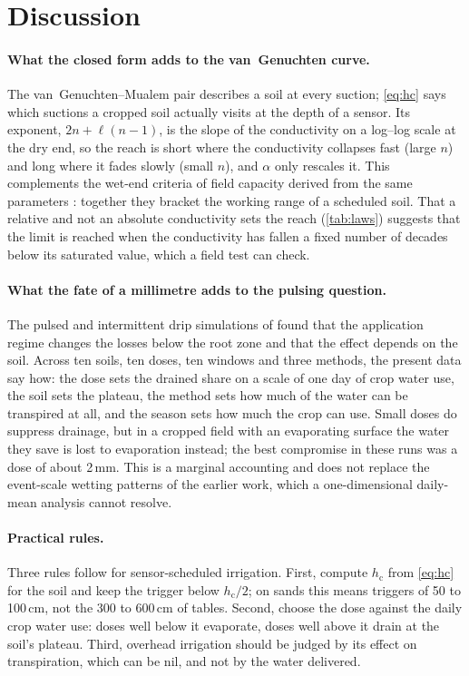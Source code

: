 \documentclass[preprint,12pt,authoryear]{elsarticle}
\newcommand{\hc}{h_{\mathrm{c}}}
\begin{document}
\section{Discussion}
\paragraph{What the closed form adds to the van~Genuchten curve.}
The van~Genuchten--Mualem pair describes a soil at every suction; \cref{eq:hc} says which suctions a cropped soil actually visits at the depth of a sensor. Its exponent, $2n+\ell(n-1)$, is the slope of the conductivity on a log--log scale at the dry end, so the reach is short where the conductivity collapses fast (large $n$) and long where it fades slowly (small $n$), and $\alpha$ only rescales it. This complements the wet-end criteria of field capacity derived from the same parameters \citep{Twarakavi2009,Assouline2014}: together they bracket the working range of a scheduled soil. That a relative and not an absolute conductivity sets the reach (\cref{tab:laws}) suggests that the limit is reached when the conductivity has fallen a fixed number of decades below its saturated value, which a field test can check.

\paragraph{What the fate of a millimetre adds to the pulsing question.}
The pulsed and intermittent drip simulations of \citet{Elmaloglou2007,Elmaloglou2008,Elmaloglou2009b} found that the application regime changes the losses below the root zone and that the effect depends on the soil. Across ten soils, ten doses, ten windows and three methods, the present data say how: the dose sets the drained share on a scale of one day of crop water use, the soil sets the plateau, the method sets how much of the water can be transpired at all, and the season sets how much the crop can use. Small doses do suppress drainage, but in a cropped field with an evaporating surface the water they save is lost to evaporation instead; the best compromise in these runs was a dose of about 2\,mm. This is a marginal accounting and does not replace the event-scale wetting patterns of the earlier work, which a one-dimensional daily-mean analysis cannot resolve.

\paragraph{Practical rules.}
Three rules follow for sensor-scheduled irrigation. First, compute $\hc$ from \cref{eq:hc} for the soil and keep the trigger below $\hc/2$; on sands this means triggers of 50 to 100\,cm, not the 300 to 600\,cm of tables. Second, choose the dose against the daily crop water use: doses well below it evaporate, doses well above it drain at the soil's plateau. Third, overhead irrigation should be judged by its effect on transpiration, which can be nil, and not by the water delivered.
\end{document}
